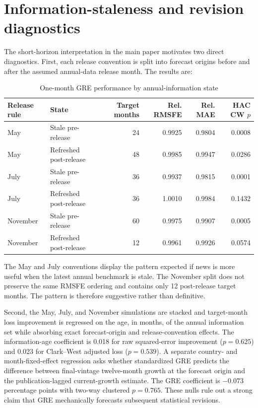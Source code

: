 \documentclass[12pt]{article}
\begin{document}
\section{Information-staleness and revision diagnostics}
The short-horizon interpretation in the main paper motivates two direct diagnostics. First, each release convention is split into forecast origins before and after the assumed annual-data release month. The results are:
\begin{table}[htbp]
\centering\scriptsize
\caption{One-month GRE performance by annual-information state}
\begin{tabular}{llrrrr}
\toprule
Release rule & State & Target months & Rel. RMSFE & Rel. MAE & HAC CW $p$\\
\midrule
May & Stale pre-release & 24 & 0.9925 & 0.9804 & 0.0008\\
May & Refreshed post-release & 48 & 0.9985 & 0.9947 & 0.0286\\
July & Stale pre-release & 36 & 0.9937 & 0.9815 & 0.0001\\
July & Refreshed post-release & 36 & 1.0010 & 0.9984 & 0.1432\\
November & Stale pre-release & 60 & 0.9975 & 0.9907 & 0.0005\\
November & Refreshed post-release & 12 & 0.9961 & 0.9926 & 0.0574\\
\bottomrule
\end{tabular}
\end{table}
The May and July conventions display the pattern expected if news is more useful when the latest annual benchmark is stale. The November split does not preserve the same RMSFE ordering and contains only 12 post-release target months. The pattern is therefore suggestive rather than definitive.

Second, the May, July, and November simulations are stacked and target-month loss improvement is regressed on the age, in months, of the annual information set while absorbing exact forecast-origin and release-convention effects. The information-age coefficient is 0.018 for raw squared-error improvement ($p=0.625$) and 0.023 for Clark--West adjusted loss ($p=0.539$). A separate country- and month-fixed-effect regression asks whether standardized GRE predicts the difference between final-vintage twelve-month growth at the forecast origin and the publication-lagged current-growth estimate. The GRE coefficient is $-0.073$ percentage points with two-way clustered $p=0.765$. These nulls rule out a strong claim that GRE mechanically forecasts subsequent statistical revisions.
\end{document}

